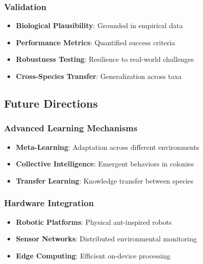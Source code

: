 \documentclass[
  13pt,
  a4paperpaper,
  12pt]{article}
\providecommand{\tightlist}{%
  \setlength{\itemsep}{0pt}\setlength{\parskip}{0pt}}
\begin{document}
\subsubsection{Validation}\label{validation}

\begin{itemize}
\tightlist
\item
  \textbf{Biological Plausibility}: Grounded in empirical data
\item
  \textbf{Performance Metrics}: Quantified success criteria
\item
  \textbf{Robustness Testing}: Resilience to real-world challenges
\item
  \textbf{Cross-Species Transfer}: Generalization across taxa
\end{itemize}

\subsection{Future Directions}\label{future-directions}

\subsubsection{Advanced Learning
Mechanisms}\label{advanced-learning-mechanisms}

\begin{itemize}
\tightlist
\item
  \textbf{Meta-Learning}: Adaptation across different environments
\item
  \textbf{Collective Intelligence}: Emergent behaviors in colonies
\item
  \textbf{Transfer Learning}: Knowledge transfer between species
\end{itemize}

\subsubsection{Hardware Integration}\label{hardware-integration}

\begin{itemize}
\tightlist
\item
  \textbf{Robotic Platforms}: Physical ant-inspired robots
\item
  \textbf{Sensor Networks}: Distributed environmental monitoring
\item
  \textbf{Edge Computing}: Efficient on-device processing
\end{itemize}
\end{document}
